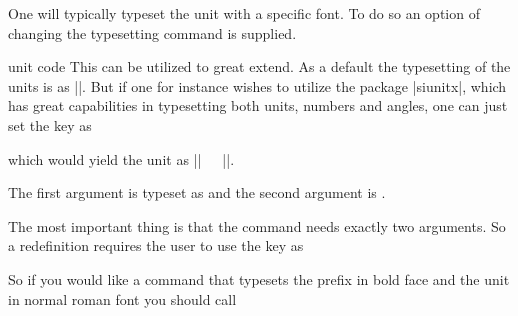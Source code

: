 One will typically typeset the unit with a specific font. To do so an option of changing the typesetting command is supplied.
\begin{pgfplotscodetwokey}{unit code}
  This can be utilized to great extend. As a default the typesetting of the units is as ||. But if one for instance
  wishes to utilize the package |siunitx|, which has great capabilities in typesetting both units, numbers and angles, one can just set the key as
\begin{codeexample}
\end{codeexample}
  which would yield the unit as |\si{||}|. 

  The first argument is typeset as  and the second argument is .
  
  The most important thing is that the command needs exactly two arguments. So a redefinition requires the user to use the key as
\begin{codeexample}
\end{codeexample}
So if you would like a command that typesets the prefix in bold face and the unit in normal roman font you should call
\begin{codeexample}[code only]
  \pgfplotsset{unit code/.code 2 args={\mathbf{#1}\mathrm{#2}}
\end{codeexample}
\end{pgfplotscodetwokey}


